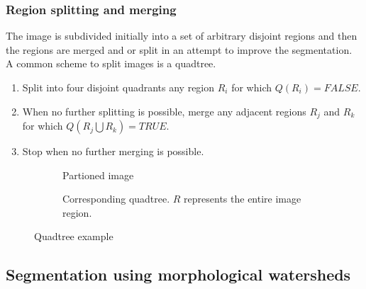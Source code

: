 \subsubsection{Region splitting and merging}
The image is subdivided initially into a set of arbitrary disjoint regions and then the regions are merged and or split in an attempt to improve the segmentation.\\
A common scheme to split images is a quadtree.\\
\begin{enumerate}
	\item Split into four disjoint quadrants any region $R_i$ for which $Q(R_i)= FALSE$.
	\item When no further splitting is possible, merge any adjacent regions $R_j$ and $R_k$ for which $Q(R_j\bigcup R_k) = TRUE$.
	\item Stop when no further merging is possible.
\end{enumerate}
\begin{figure}[h]
	\centering
	\begin{subfigure}{0.3\textwidth}
		\centering
		
		\caption{Partioned image}
	\end{subfigure}
	\begin{subfigure}{0.5\textwidth}
		\centering
		
		\caption{Corresponding quadtree. $R$ represents the entire image region.}
	\end{subfigure}
	\caption{Quadtree example}
\end{figure}


\subsection{Segmentation using morphological watersheds}

